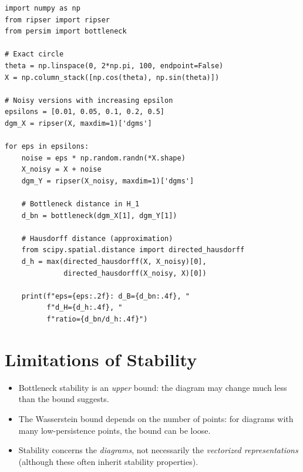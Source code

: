 \begin{codeblock}[title=\textbf{Numerical Verification of Stability}]
\begin{verbatim}
import numpy as np
from ripser import ripser
from persim import bottleneck

# Exact circle
theta = np.linspace(0, 2*np.pi, 100, endpoint=False)
X = np.column_stack([np.cos(theta), np.sin(theta)])

# Noisy versions with increasing epsilon
epsilons = [0.01, 0.05, 0.1, 0.2, 0.5]
dgm_X = ripser(X, maxdim=1)['dgms']

for eps in epsilons:
    noise = eps * np.random.randn(*X.shape)
    X_noisy = X + noise
    dgm_Y = ripser(X_noisy, maxdim=1)['dgms']

    # Bottleneck distance in H_1
    d_bn = bottleneck(dgm_X[1], dgm_Y[1])

    # Hausdorff distance (approximation)
    from scipy.spatial.distance import directed_hausdorff
    d_h = max(directed_hausdorff(X, X_noisy)[0],
              directed_hausdorff(X_noisy, X)[0])

    print(f"eps={eps:.2f}: d_B={d_bn:.4f}, "
          f"d_H={d_h:.4f}, "
          f"ratio={d_bn/d_h:.4f}")
\end{verbatim}
\end{codeblock}

\section{Limitations of Stability}

\begin{warning}[title=\textbf{Limitations}]
\begin{itemize}
  \item Bottleneck stability is an \emph{upper} bound: the diagram may
        change much less than the bound suggests.
  \item The Wasserstein bound depends on the number of points: for
        diagrams with many low-persistence points, the bound can be
        loose.
  \item Stability concerns the \emph{diagrams}, not necessarily the
        \emph{vectorized representations} (although these often inherit
        stability properties).
\end{itemize}
\end{warning}

